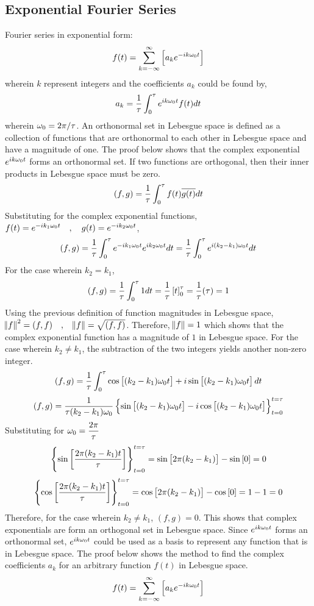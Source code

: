 \documentclass[a4paper, 12pt]{report}
\begin{document}
\begin{center}
\section{Exponential Fourier Series}
\begin{comment}
\end{comment}
Fourier series in exponential form:
$$f(t) = \sum^{\infty}_{k = -\infty}\left[a_ke^{-ik\omega_0t}\right]$$
wherein $k$ represent integers and the coefficients $a_k$ could be found by,
$$a_k = \frac{1}{\tau}\int^{\tau}_{0}e^{ik\omega_0t}f(t)dt$$
wherein $\omega_0 = 2\pi/\tau$. An orthonormal set in Lebesgue space is defined as a collection of functions that are orthonormal to each other in Lebesgue space and have a magnitude of one. The proof below shows that the complex exponential $e^{ik\omega_0t}$ forms an orthonormal set. If two functions are orthogonal, then their inner products in Lebesgue space must be zero.
$$(f,g) = \frac{1}{\tau}\int^{\tau}_{0}f(t)\overline{g(t)}dt$$
Substituting for the complex exponential functions, $f(t) = e^{-ik_1\omega_0t}\quad,\quad g(t) = e^{-ik_2\omega_0t}$,
$$(f,g) = \frac{1}{\tau}\int^{\tau}_{0}e^{-ik_1\omega_0t} e^{ik_2\omega_0t}dt = \frac{1}{\tau}\int^{\tau}_{0}e^{i(k_2-k_1)\omega_0t}dt$$
For the case wherein $k_2 = k_1$, 
$$(f,g) = \frac{1}{\tau}\int^{\tau}_{0}1dt = \frac{1}{\tau} \left[t\right]^{\tau}_{0} = \frac{1}{\tau}(\tau) = 1$$
Using the previous definition of function magnitudes in Lebesgue space, $\norm{f}^2 = (f,f)\quad,\quad\norm{f} = \sqrt{(f,f)}$. Therefore, $\norm{f} = 1$ which shows that the complex exponential function has a magnitude of $1$ in Lebesgue space. For the case wherein $k_2 \neq k_1$, the subtraction of the two integers yields another non-zero integer.
$$(f,g) = \frac{1}{\tau}\int^{\tau}_{0} \cos\left[(k_2-k_1)\omega_0t\right] + i\sin\left[(k_2-k_1)\omega_0t\right]dt$$
$$(f,g) = \frac{1}{\tau(k_2-k_1)\omega_0}\left\{\sin\left[(k_2-k_1)\omega_0t\right] - i\cos\left[(k_2-k_1)\omega_0t\right]\right\}^{t = \tau}_{t = 0}$$
Substituting for $\displaystyle{\omega_0 = \frac{2\pi}{\tau}}$ 
$$\left\{\sin\left[\frac{2\pi(k_2-k_1)t}{\tau}\right]\right\}^{t = \tau}_{t = 0} = \sin\left[2\pi(k_2-k_1)\right] - \sin\left[0\right] = 0$$
$$\left\{\cos\left[\frac{2\pi(k_2-k_1)t}{\tau}\right]\right\}^{t = \tau}_{t = 0} = \cos\left[2\pi(k_2-k_1)\right] - \cos\left[0\right] = 1 - 1 = 0$$
Therefore, for the case wherein $k_2 \neq k_1$, $(f,g) = 0$. This shows that complex exponentials are form an orthogonal set in Lebesgue space. Since $e^{ik\omega_0t}$ forms an orthonormal set, $e^{ik\omega_0t}$ could be used as a basis to represent any function that is in Lebesgue space. The proof below shows the method to find the complex coefficients $a_k$ for an arbitrary function $f(t)$ in Lebesgue space.
$$f(t) = \sum^{\infty}_{k = -\infty}\left[a_ke^{-ik\omega_0t}\right]$$

\end{center}
\end{document}
